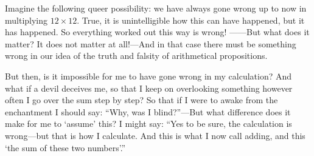 Imagine the following queer possibility: we have always gone wrong up to now in multiplying $12\times12$. True, it is unintelligible how this can have happened, but it has happened. So everything worked out this way is wrong! ------But what does it matter? It does not matter at all!---And in that case there must be something wrong in our idea of the truth and falsity of arithmetical propositions.

But then, is it impossible for me to have gone wrong in my calculation? And what if a devil deceives me, so that I keep on overlooking something however often I go over the sum step by step? So that if I were to awake from the enchantment I should say: ``Why, was I blind?''---But what difference does it make for me to `assume' this? I might say: ``Yes to be sure, the calculation is wrong---but that is how I calculate. And this is what I now call adding, and this `the sum of these two numbers'.''

